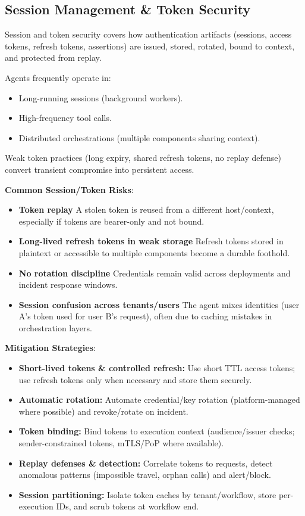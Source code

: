 \begin{TNtwocol}
    \section{Session Management & Token Security }

    Session and token security covers how authentication artifacts (sessions, access tokens, refresh tokens, assertions) are issued, stored, rotated, bound to context, and protected from replay.

    Agents frequently operate in:

    \begin{itemize}
        \item Long-running sessions (background workers).
        \item High-frequency tool calls.
        \item Distributed orchestrations (multiple components sharing context).
    \end{itemize}

    Weak token practices (long expiry, shared refresh tokens, no replay defense) convert transient compromise into persistent access.

    \textbf{Common Session/Token Risks}:
    \begin{itemize}
        \item \textbf{Token replay} A stolen token is reused from a different host/context, especially if tokens are bearer-only and not bound.
        \item \textbf{Long-lived refresh tokens in weak storage} Refresh tokens stored in plaintext or accessible to multiple components become a durable foothold.
        \item \textbf{No rotation discipline} Credentials remain valid across deployments and incident response windows.
        \item \textbf{Session confusion across tenants/users} The agent mixes identities (user A's token used for user B's request), often due to caching mistakes in orchestration layers.
    \end{itemize}

    \textbf{Mitigation Strategies}:
    \begin{itemize}
        \item \textbf{Short-lived tokens \& controlled refresh:} Use short TTL access tokens; use refresh tokens only when necessary and store them securely.
        \item \textbf{Automatic rotation:} Automate credential/key rotation (platform-managed where possible) and revoke/rotate on incident.
        \item \textbf{Token binding:} Bind tokens to execution context (audience/issuer checks; sender-constrained tokens, mTLS/PoP where available).
        \item \textbf{Replay defenses \& detection:} Correlate tokens to requests, detect anomalous patterns (impossible travel, orphan calls) and alert/block.
        \item \textbf{Session partitioning:} Isolate token caches by tenant/workflow, store per-execution IDs, and scrub tokens at workflow end.
    \end{itemize}


\end{TNtwocol}
